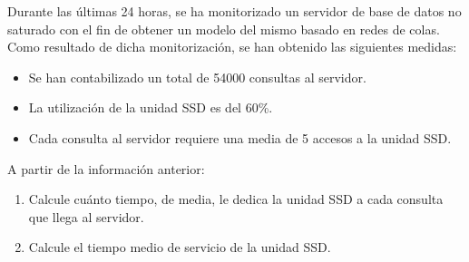 \begin{ejercicio}\label{ej:5.30}
    Durante las últimas 24 horas, se ha monitorizado un servidor de base de datos no saturado con el fin de obtener un modelo del mismo basado en redes de colas. Como resultado de dicha monitorización, se han obtenido las siguientes medidas:
    \begin{itemize}
        \item Se han contabilizado un total de 54000 consultas al servidor.
        \item La utilización de la unidad SSD es del 60\%.
        \item Cada consulta al servidor requiere una media de 5 accesos a la unidad SSD.
    \end{itemize}
    A partir de la información anterior:
    \begin{enumerate}
        \item Calcule cuánto tiempo, de media, le dedica la unidad SSD a cada consulta que llega al servidor.
        \item Calcule el tiempo medio de servicio de la unidad SSD.
    \end{enumerate}
\end{ejercicio}
\begin{comment}
\solucion
    \begin{enumerate}
        \item La demanda de servicio de la unidad SSD es $D_{ssd} = 0.96$ s (nos piden la demanda de servicio).
        \item El tiempo medio de servicio de la unidad SSD es $S_{ssd} = 0.192$ s.
    \end{enumerate}
\end{comment}

